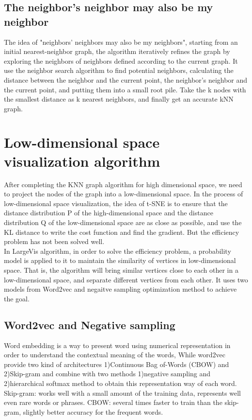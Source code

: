 \subsection{The neighbor’s neighbor may also be my neighbor}

The idea of "neighbors' neighbors may also be my neighbors", starting from an initial nearest-neighbor graph, the algorithm iteratively refines the graph by exploring the neighbors of neighbors defined according to the current graph\cite{ref5}. It use the neighbor search algorithm to find potential neighbors, calculating the distance between the neighbor and the current point, the neighbor's neighbor and the current point, and putting them into a small root pile. Take the k nodes with the smallest distance as k nearest neighbors, and finally get an accurate kNN graph.\\

\section{Low-dimensional space visualization algorithm}

\noindent After completing the KNN graph algorithm for high dimensional space, we need to project the nodes of the graph into a low-dimensional space. In the process of low-dimensional space visualization, the idea of t-SNE is to ensure that the distance distribution P of the high-dimensional space and the distance distribution Q of the low-dimensional space are as close as possible, and use the KL distance to write the cost function and find the gradient. But the efficiency problem has not been solved well.\\

\noindent In LargeVis algorithm, in order to solve the efficiency problem, a probability model is applied to it to maintain the similarity of vertices in low-dimensional space. That is, the algorithm will bring similar vertices close to each other in a low-dimensional space, and separate different vertices from each other. It uses two models from Word2vec and negaitve sampling optimization method to 
achieve the goal.

\subsection{Word2vec and Negative sampling}
Word embedding is a way to present word using numerical representation in order to understand the contextual meaning of the words, While word2vec provide two kind of architectures 1)Continuous Bag of-Words (CBOW) and 2)Skip-gram and combine with two methods 1)negative sampling and 2)hierarchical softmax method to obtain this representation way of each word. Skip-gram: works well with a small amount of the training data, represents well even rare words or phrases. CBOW: several times faster to train than the skip-gram, slightly better accuracy for the frequent words.

